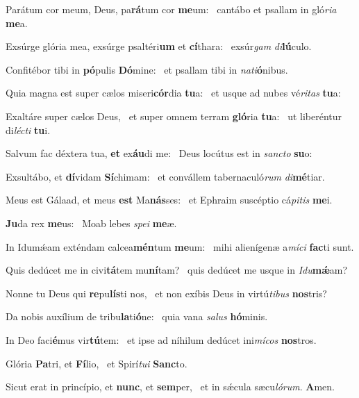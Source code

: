 \item Parátum cor meum, Deus, pa\textbf{rá}tum cor \textbf{me}um:~\psstar{} cantábo et psallam in gló\textit{ria} \textbf{me}a.
\item Exsúrge glória mea, exsúrge psaltéri\textbf{um} et \textbf{cí}thara:~\psstar{} exsúr\textit{gam} \textit{di}\textbf{lú}culo.
\item Confitébor tibi in \textbf{pó}pulis \textbf{Dó}mine:~\psstar{} et psallam tibi in \textit{nati}\textbf{ó}nibus.
\item Quia magna est super cælos miseri\textbf{cór}dia \textbf{tu}a:~\psstar{} et usque ad nubes vé\textit{ritas} \textbf{tu}a:
\item Exaltáre super cælos Deus,~\pscross{} et super omnem terram \textbf{gló}ria \textbf{tu}a:~\psstar{} ut liberéntur di\textit{lécti} \textbf{tu}i.
\item Salvum fac déxtera tua, \textbf{et} ex\textbf{áu}di me:~\psstar{} Deus locútus est in \textit{sancto} \textbf{su}o:
\item Exsultábo, et \textbf{dí}vidam \textbf{Sí}chimam:~\psstar{} et convállem tabernaculó\textit{rum} \textit{di}\textbf{mé}tiar.
\item Meus est Gálaad, et meus \textbf{est} Ma\textbf{nás}ses:~\psstar{} et Ephraim suscéptio cá\textit{pitis} \textbf{me}i.
\item \textbf{Ju}da rex \textbf{me}us:~\psstar{} Moab lebes \textit{spei} \textbf{me}æ.
\item In Idumǽam exténdam calcea\textbf{mén}tum \textbf{me}um:~\psstar{} mihi alienígenæ a\textit{míci} \textbf{fac}ti sunt.
\item Quis dedúcet me in civi\textbf{tá}tem mu\textbf{ní}tam?~\psstar{} quis dedúcet me usque in \textit{Idu}\textbf{mǽ}am?
\item Nonne tu Deus qui \textbf{re}pu\textbf{lís}ti nos,~\psstar{} et non exíbis Deus in virtú\textit{tibus} \textbf{nos}tris?
\item Da nobis auxílium de tribu\textbf{la}ti\textbf{ó}ne:~\psstar{} quia vana \textit{salus} \textbf{hó}minis.
\item In Deo faci\textbf{é}mus vir\textbf{tú}tem:~\psstar{} et ipse ad níhilum dedúcet ini\textit{mícos} \textbf{nos}tros.
\item Glória \textbf{Pa}tri, et \textbf{Fí}lio,~\psstar{} et Spirí\textit{tui} \textbf{Sanc}to.
\item Sicut erat in princípio, et \textbf{nunc}, et \textbf{sem}per,~\psstar{} et in sǽcula sæcu\textit{lórum}. \textbf{A}men.